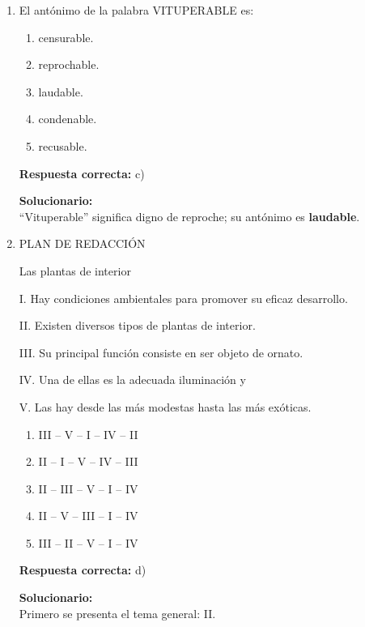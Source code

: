 \begin{enumerate}
	\vspace{2mm}
	\textbf{Solucionario:}\\
	La palabra ``estación'' tiene varios significados relacionados entre sí; eso es \textbf{polisemia}.
	
	\vspace{6mm}
	
	\item El antónimo de la palabra VITUPERABLE es:
	\begin{enumerate}[label=\alph*)]
		\item censurable.
		\item reprochable.
		\item laudable.
		\item condenable.
		\item recusable.
	\end{enumerate}
	\textbf{Respuesta correcta:} c)
	
	\vspace{2mm}
	\textbf{Solucionario:}\\
	``Vituperable'' significa digno de reproche; su antónimo es \textbf{laudable}.
	
	\vspace{6mm}
	
	\item PLAN DE REDACCIÓN
	
	Las plantas de interior
	
	I. Hay condiciones ambientales para promover su eficaz desarrollo.
	
	II. Existen diversos tipos de plantas de interior.
	
	III. Su principal función consiste en ser objeto de ornato.
	
	IV. Una de ellas es la adecuada iluminación y
	
	V. Las hay desde las más modestas hasta las más exóticas.
	
	\begin{enumerate}[label=\alph*)]
		\item III -- V -- I -- IV -- II
		\item II -- I -- V -- IV -- III
		\item II -- III -- V -- I -- IV
		\item II -- V -- III -- I -- IV
		\item III -- II -- V -- I -- IV
	\end{enumerate}
	\textbf{Respuesta correcta:} d)
	
	\vspace{2mm}
	\textbf{Solucionario:}\\
	Primero se presenta el tema general: II.
	

\end{enumerate}
